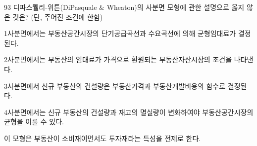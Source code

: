 \begin{question}{93}
디파스퀠리-위튼(DiPasquale \& Wheaton)의 사분면 모형에 관한 설명으로 옳지 않은 것은? (단, 주어진 조건에 한함)
\begin{choices}
  \item 1사분면에서는 부동산공간시장의 단기공급곡선과 수요곡선에 의해 균형임대료가 결정된다.
  \item 2사분면에서는 부동산의 임대료가 가격으로 환원되는 부동산자산시장의 조건을 나타낸다.
  \item 3사분면에서 신규 부동산의 건설량은 부동산가격과 부동산개발비용의 함수로 결정된다.
  \item 4사분면에서는 신규 부동산의 건설량과 재고의 멸실량이 변화하여야 부동산공간시장의 균형을 이룰 수 있다.
  \item 이 모형은 부동산이 소비재이면서도 투자재라는 특성을 전제로 한다.
\end{choices}
\end{question}
